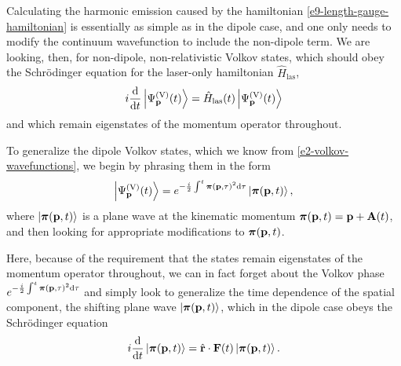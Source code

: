 Calculating the harmonic emission caused by the hamiltonian \eqref{e9-length-gauge-hamiltonian} is essentially as simple as in the dipole case, and one only needs to modify the continuum wavefunction to include the non-dipole term. We are looking, then, for non-dipole, non-relativistic Volkov states, which should obey the Schrödinger equation for the laser-only hamiltonian $\hat H_\mathrm{las}$,
\begin{equation}
i\frac{\mathrm{d}}{\mathrm{d} t}\ket{\Psi^\mathrm{(V)}_{\vb{p}}(t)} = \hat H_\mathrm{las}(t) \ket{\Psi^\mathrm{(V)}_{\vb{p}}(t)} 
\end{equation}
and which remain eigenstates of the momentum operator throughout. 


To generalize the dipole Volkov states, which we know from \eqref{e2-volkov-wavefunctions}, we begin by phrasing them in the form
\begin{equation}
\ket{\Psi^\mathrm{(V)}_{\vb{p}}(t)}=e^{-\frac i2 \int^t\boldsymbol{\pi}(\vb{p},\tau)^2\mathrm{d} \tau}\ket{\boldsymbol{\pi}(\vb{p},t)},
\label{e9-volkov-state-definition}
\end{equation}
where $\ket{\boldsymbol{\pi}(\vb{p},t)}$ is a plane wave at the kinematic momentum $\boldsymbol{\pi}(\vb{p},t)=\vb{p}+\vb{A}(t)$, and then looking for appropriate modifications to $\boldsymbol{\pi}(\vb{p},t)$. 


Here, because of the requirement that the states remain eigenstates of the momentum operator throughout, we can in fact forget about the Volkov phase $e^{-\frac i2 \int^t\boldsymbol{\pi}(\vb{p},\tau)^2\mathrm{d} \tau}$ and simply look to generalize the time dependence of the spatial component, the shifting plane wave $\ket{\boldsymbol{\pi}(\vb{p},t)}$, which in the dipole case obeys the Schrödinger equation
\begin{equation}
i\frac{\mathrm{d}}{\mathrm{d} t}\ket{\boldsymbol{\pi}(\vb{p},t)} 
= 
\hat {\vb{r}}\cdot\vb{F}(t) \ket{\boldsymbol{\pi}(\vb{p},t)}.
\end{equation}


